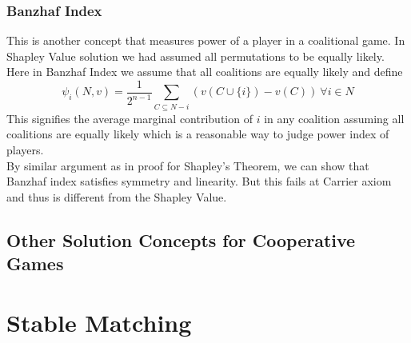 \documentclass{article}
\theoremstyle{definition}
\begin{document}
\subsubsection{Banzhaf Index}
This is another concept that measures power of a player in a coalitional game. In Shapley Value solution we had assumed all permutations to be equally likely. Here in Banzhaf Index we assume that all coalitions are equally likely and define $$\psi_i(N,v) = \frac{1}{2^{n-1}} \sum_{C\subseteq N-i} (v(C\cup \{i\}) - v(C))~\forall i \in N$$
This signifies the average marginal contribution of $i$ in any coalition assuming all coalitions are equally likely which is a reasonable way to judge power index of players.\\
By similar argument as in proof for Shapley's Theorem, we can show that Banzhaf index satisfies symmetry and linearity. But this fails at Carrier axiom and thus is different from the Shapley Value.
\subsection{Other Solution Concepts for Cooperative Games}

\section{Stable Matching}
\end{document}
